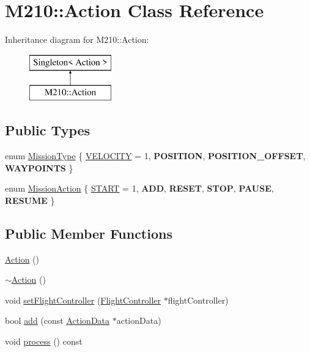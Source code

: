 \hypertarget{class_m210_1_1_action}{}\section{M210\+:\+:Action Class Reference}
\label{class_m210_1_1_action}
Inheritance diagram for M210\+:\+:Action\+:\begin{figure}[H]
\begin{center}
\leavevmode
\includegraphics[height=2.000000cm]{class_m210_1_1_action}
\end{center}
\end{figure}
\subsection*{Public Types}
\begin{DoxyCompactItemize}
\item 
enum \mbox{\hyperlink{class_m210_1_1_action_ad9730775da7e3f099bef4571100e2f5d}{Mission\+Type}} \{ \mbox{\hyperlink{class_m210_1_1_action_ad9730775da7e3f099bef4571100e2f5da2c44c9af44f0d97e16ee0f7c0562658f}{V\+E\+L\+O\+C\+I\+TY}} = 1, 
{\bfseries P\+O\+S\+I\+T\+I\+ON}, 
{\bfseries P\+O\+S\+I\+T\+I\+O\+N\+\_\+\+O\+F\+F\+S\+ET}, 
{\bfseries W\+A\+Y\+P\+O\+I\+N\+TS}
 \}
\item 
enum \mbox{\hyperlink{class_m210_1_1_action_a0bb36f0932c930e1193428e3c3c98046}{Mission\+Action}} \{ \newline
\mbox{\hyperlink{class_m210_1_1_action_a0bb36f0932c930e1193428e3c3c98046ae9c51def583033613d398c85a26e927a}{S\+T\+A\+RT}} = 1, 
{\bfseries A\+DD}, 
{\bfseries R\+E\+S\+ET}, 
{\bfseries S\+T\+OP}, 
\newline
{\bfseries P\+A\+U\+SE}, 
{\bfseries R\+E\+S\+U\+ME}
 \}
\end{DoxyCompactItemize}
\subsection*{Public Member Functions}
\begin{DoxyCompactItemize}
\item 
\mbox{\hyperlink{class_m210_1_1_action_a4f457ccfc8336b565cadca56b36e0271}{Action}} ()
\item 
\mbox{\hyperlink{class_m210_1_1_action_acdb06775d157339256a8ecd55749226c}{$\sim$\+Action}} ()
\item 
void \mbox{\hyperlink{class_m210_1_1_action_a2079c96a8a88d045037c730f3f752d25}{set\+Flight\+Controller}} (\mbox{\hyperlink{class_m210_1_1_flight_controller}{Flight\+Controller}} $\ast$flight\+Controller)
\item 
bool \mbox{\hyperlink{class_m210_1_1_action_abd7130a46d5212979903418a0888aab5}{add}} (const \mbox{\hyperlink{class_m210_1_1_action_data}{Action\+Data}} $\ast$action\+Data)
\item 
void \mbox{\hyperlink{class_m210_1_1_action_a38eac84b9b832225548d16d37b16ffbd}{process}} () const
\end{DoxyCompactItemize}
